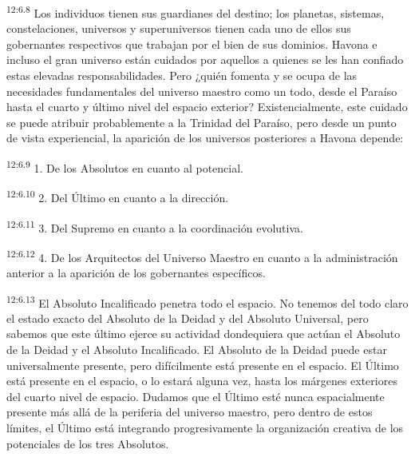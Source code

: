 \par
\textsuperscript{12:6.8} Los individuos tienen sus guardianes del destino; los planetas, sistemas, constelaciones, universos y superuniversos tienen cada uno de ellos sus gobernantes respectivos que trabajan por el bien de sus dominios. Havona e incluso el gran universo están cuidados por aquellos a quienes se les han confiado estas elevadas responsabilidades. Pero ¿quién fomenta y se ocupa de las necesidades fundamentales del universo maestro como un todo, desde el Paraíso hasta el cuarto y último nivel del espacio exterior? Existencialmente, este cuidado se puede atribuir probablemente a la Trinidad del Paraíso, pero desde un punto de vista experiencial, la aparición de los universos posteriores a Havona depende:

\par
\textsuperscript{12:6.9} 1. De los Absolutos en cuanto al potencial.

\par
\textsuperscript{12:6.10} 2. Del Último en cuanto a la dirección.

\par
\textsuperscript{12:6.11} 3. Del Supremo en cuanto a la coordinación evolutiva.

\par
\textsuperscript{12:6.12} 4. De los Arquitectos del Universo Maestro en cuanto a la administración anterior a la aparición de los gobernantes específicos.

\par
\textsuperscript{12:6.13} El Absoluto Incalificado penetra todo el espacio. No tenemos del todo claro el estado exacto del Absoluto de la Deidad y del Absoluto Universal, pero sabemos que este último ejerce su actividad dondequiera que actúan el Absoluto de la Deidad y el Absoluto Incalificado. El Absoluto de la Deidad puede estar universalmente presente, pero difícilmente está presente en el espacio. El Último está presente en el espacio, o lo estará alguna vez, hasta los márgenes exteriores del cuarto nivel de espacio. Dudamos que el
Último esté nunca espacialmente presente más allá de la periferia del universo maestro, pero dentro de estos límites, el Último está integrando progresivamente la organización creativa de los potenciales de los tres Absolutos.

